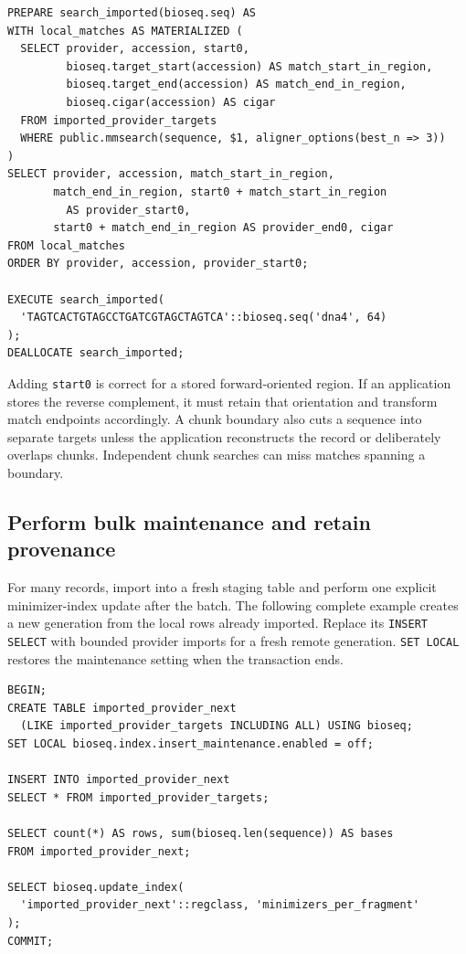 \par\noindent\begin{minipage}{\linewidth}
\begin{lstlisting}[style=bioseq-appendix-sql]
PREPARE search_imported(bioseq.seq) AS
WITH local_matches AS MATERIALIZED (
  SELECT provider, accession, start0,
         bioseq.target_start(accession) AS match_start_in_region,
         bioseq.target_end(accession) AS match_end_in_region,
         bioseq.cigar(accession) AS cigar
  FROM imported_provider_targets
  WHERE public.mmsearch(sequence, $1, aligner_options(best_n => 3))
)
SELECT provider, accession, match_start_in_region,
       match_end_in_region, start0 + match_start_in_region
         AS provider_start0,
       start0 + match_end_in_region AS provider_end0, cigar
FROM local_matches
ORDER BY provider, accession, provider_start0;

EXECUTE search_imported(
  'TAGTCACTGTAGCCTGATCGTAGCTAGTCA'::bioseq.seq('dna4', 64)
);
DEALLOCATE search_imported;
\end{lstlisting}
\end{minipage}

Adding \texttt{start0} is correct for a stored forward-oriented region. If an
application stores the reverse complement, it must retain that orientation
and transform match endpoints accordingly. A chunk boundary also cuts a
sequence into separate targets unless the application reconstructs the
record or deliberately overlaps chunks. Independent chunk searches can miss
matches spanning a boundary.

\subsection{Perform bulk maintenance and retain provenance}

For many records, import into a fresh staging table and perform one explicit
minimizer-index update after the batch. The following complete example creates
a new generation from the local rows already imported. Replace its
\texttt{INSERT SELECT} with bounded provider imports for a fresh remote
generation. \texttt{SET LOCAL} restores the maintenance setting when the
transaction ends.

\par\noindent\begin{minipage}{\linewidth}
\begin{lstlisting}[style=bioseq-appendix-sql]
BEGIN;
CREATE TABLE imported_provider_next
  (LIKE imported_provider_targets INCLUDING ALL) USING bioseq;
SET LOCAL bioseq.index.insert_maintenance.enabled = off;

INSERT INTO imported_provider_next
SELECT * FROM imported_provider_targets;

SELECT count(*) AS rows, sum(bioseq.len(sequence)) AS bases
FROM imported_provider_next;

SELECT bioseq.update_index(
  'imported_provider_next'::regclass, 'minimizers_per_fragment'
);
COMMIT;
\end{lstlisting}
\end{minipage}


